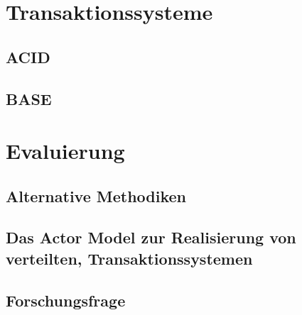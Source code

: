 \chapter{Transaktionssysteme}
\section{ACID}\label{sec:transactionTheory:acid}
\section{BASE}\label{sec:transactionTheory:base}
\chapter{Evaluierung}
\section{Alternative Methodiken}
\section{Das Actor Model zur Realisierung von verteilten, Transaktionssystemen} 
\section{Forschungsfrage} 
